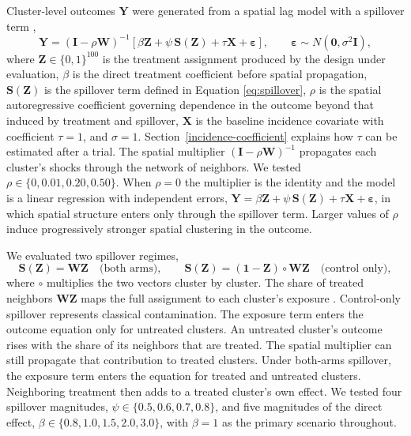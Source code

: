 \documentclass[11pt]{article}
\begin{document}
Cluster-level outcomes \(\mathbf{Y}\) were generated from a spatial lag model
with a spillover term \citep{ord_estimation_1975,lesage_introduction_2009}, \begin{equation}
\mathbf{Y} = (\mathbf{I} - \rho \mathbf{W})^{-1}\left[\beta \mathbf{Z} + \psi\,\mathbf{S}(\mathbf{Z}) + \tau \mathbf{X} + \boldsymbol{\varepsilon}\right], \qquad \boldsymbol{\varepsilon} \sim N(\mathbf{0}, \sigma^2 \mathbf{I}),
\label{eq:outcome}
\end{equation} where \(\mathbf{Z} \in \{0,1\}^{100}\) is the treatment assignment
produced by the design under evaluation, \(\beta\) is the direct
treatment coefficient before spatial propagation, \(\mathbf{S}(\mathbf{Z})\) is the spillover term defined in
Equation \ref{eq:spillover}, \(\rho\) is the spatial autoregressive
coefficient governing dependence in the outcome beyond that induced by
treatment and spillover, \(\mathbf{X}\) is the baseline incidence covariate with
coefficient \(\tau = 1\), and \(\sigma = 1\). Section~\ref{incidence-coefficient} explains how \(\tau\) can be estimated after a trial. The spatial multiplier
\((\mathbf{I}-\rho \mathbf{W})^{-1}\) propagates each cluster's shocks through the network
of neighbors. We tested \(\rho \in \{0, 0.01, 0.20, 0.50\}\). When
\(\rho = 0\) the multiplier is the identity and the model is a linear
regression with independent errors,
\(\mathbf{Y} = \beta \mathbf{Z} + \psi\,\mathbf{S}(\mathbf{Z}) + \tau \mathbf{X} + \boldsymbol{\varepsilon}\), in which spatial structure
enters only through the spillover term. Larger values of \(\rho\) induce
progressively stronger spatial clustering in the outcome.

We evaluated two spillover regimes, \begin{equation}
\mathbf{S}(\mathbf{Z}) = \mathbf{W}\mathbf{Z} \quad \text{(both arms)}, \qquad \mathbf{S}(\mathbf{Z}) = (\mathbf{1} - \mathbf{Z}) \circ \mathbf{W}\mathbf{Z} \quad \text{(control only)},
\label{eq:spillover}
\end{equation} where \(\circ\) multiplies the two vectors cluster by cluster. The share of treated neighbors \(\mathbf{W}\mathbf{Z}\) maps the full assignment to each cluster's exposure \citep{aronow_estimating_2017,forastiere_identification_2021}.
Control-only spillover represents classical contamination. The exposure
term enters the outcome equation only for untreated clusters. An
untreated cluster's outcome rises with the share of its neighbors that
are treated. The spatial multiplier can still propagate that contribution
to treated clusters. Under both-arms spillover, the exposure term
enters the equation for treated and untreated clusters. Neighboring
treatment then adds to a treated cluster's own effect. We tested four spillover magnitudes,
\(\psi \in \{0.5, 0.6, 0.7, 0.8\}\), and five magnitudes of the direct
effect, \(\beta \in \{0.8, 1.0, 1.5, 2.0, 3.0\}\), with \(\beta = 1\) as
the primary scenario throughout.
\end{document}
